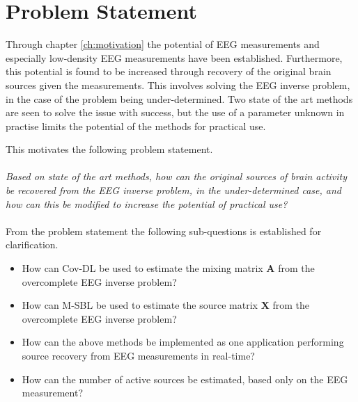 \chapter{Problem Statement}\label{ch:problemstatement}
Through chapter \ref{ch:motivation} the potential of EEG measurements and especially low-density EEG measurements have been established. Furthermore, this potential is found to be increased through recovery of the original brain sources given the measurements. This involves solving the EEG inverse problem, in the case of the problem being under-determined.
Two state of the art methods are seen to solve the issue with success, but the use of a parameter unknown in practise limits the potential of the methods for practical use.

This motivates the following problem statement.         
\\ \\
\textit{Based on state of the art methods, how can the original sources of brain activity be recovered from the EEG inverse problem, in the under-determined case, and how can this be modified to increase the potential of practical use?}
\\ \\
From the problem statement the following sub-questions is established for clarification.
\begin{itemize}
\item How can Cov-DL be used to estimate the mixing matrix $\mathbf{A}$ from the overcomplete EEG inverse problem?
\item How can M-SBL be used to estimate the source matrix $\mathbf{X}$ from the overcomplete EEG inverse problem?
\item How can the above methods be implemented as one application performing source recovery from EEG measurements in real-time? 
\item How can the number of active sources be estimated, based only on the EEG measurement? 
\end{itemize}

 